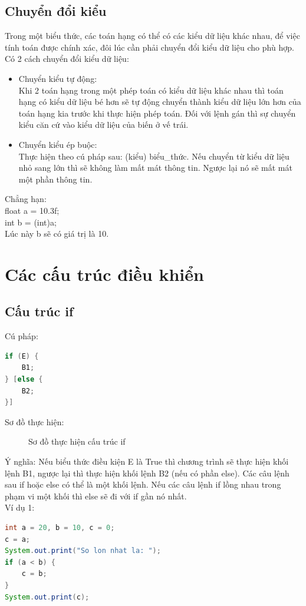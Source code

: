 \subsection{Chuyển đổi kiểu}
\indent Trong một biểu thức, các toán hạng có thể có các kiểu dữ liệu khác nhau, để việc tính toán được chính xác, đôi lúc cần phải chuyển đổi kiểu dữ liệu cho phù hợp. Có 2 cách chuyển đổi kiểu dữ liệu: 
\begin{itemize}
\item Chuyển kiểu tự động:\\
Khi 2 toán hạng trong một phép toán có kiểu dữ liệu khác nhau thì toán hạng có kiểu dữ liệu bé hơn sẽ tự động chuyển thành kiểu dữ liệu lớn hơn của toán hạng kia trước khi thực hiện phép toán. Đối với lệnh gán thì sự chuyển kiểu căn cứ vào kiểu dữ liệu của biến ở vế trái.
\item Chuyển kiểu ép buộc: \\
Thực hiện theo cú pháp sau: {\ttfamily (kiểu) biểu\_thức}. Nếu chuyển từ kiểu dữ liệu nhỏ sang lớn thì sẽ không làm mất mát thông tin. Ngược lại nó sẽ mất mát một phần thông tin.
\end{itemize}

\indent Chẳng hạn: \\
{\ttfamily
float a = 10.3f;\\
int b = (int)a;}\\
\indent Lúc này b sẽ có giá trị là 10.
\section{Các cấu trúc điều khiển}
\subsection{Cấu trúc if}
\indent Cú pháp:
\begin{lstlisting}[escapechar=',language=java]	
if (E) {
	B1;
} [else {
	B2;
}]
\end{lstlisting}

\indent Sơ đồ thực hiện:
\begin{figure}[!ht]
\centering

\caption{Sơ đồ thực hiện cấu trúc if}\label{hinh13} 
\end{figure}

\indent Ý nghĩa: Nếu biểu thức điều kiện E là True thì chương trình sẽ thực hiện khối lệnh {\ttfamily B1}, ngược lại thì thực hiện khối lệnh {\ttfamily B2} (nếu có phần else). Các câu lệnh sau if hoặc else có thể là một khối lệnh. Nếu các câu lệnh if lồng nhau trong phạm vi một khối thì else sẽ đi với if gần nó nhất.\\
\indent Ví dụ 1:
\begin{lstlisting}[escapechar=!,language=java]	
int a = 20, b = 10, c = 0;
c = a;
System.out.print("So lon nhat la: ");
if (a < b) {
	c = b;
}
System.out.print(c);
\end{lstlisting}

